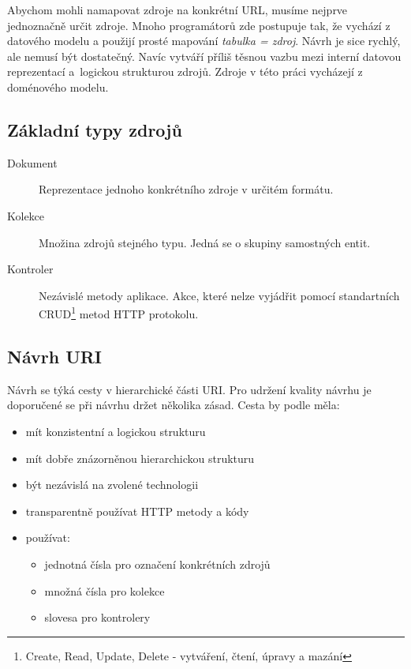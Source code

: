 Abychom mohli namapovat zdroje na konkrétní URL, musíme nejprve jednoznačně určit zdroje.
Mnoho programátorů zde postupuje tak, že vychází z datového modelu a použijí prosté mapování \textit{tabulka = zdroj}.
Návrh je sice rychlý, ale nemusí být dostatečný. Navíc vytváří příliš těsnou vazbu mezi interní datovou reprezentací
a~logickou strukturou zdrojů. Zdroje v této práci vycházejí z doménového modelu.

\subsection{Základní typy zdrojů \cite{rest_vse}}

\begin{description}
  \item[Dokument] Reprezentace jednoho konkrétního zdroje v určitém formátu.
  \item[Kolekce] Množina zdrojů stejného typu. Jedná se o skupiny samostných entit.
  \item[Kontroler] Nezávislé metody aplikace. Akce, které nelze vyjádřit pomocí standartních
  CRUD\footnote{Create, Read, Update, Delete - vytváření, čtení, úpravy a mazání} metod HTTP protokolu.
\end{description}

\subsection{Návrh URI}

Návrh se týká cesty v hierarchické části URI. Pro udržení kvality návrhu je doporučené se při návrhu  držet několika zásad. Cesta by podle \cite{rest_vse} měla:
    
\begin{itemize}
\item mít konzistentní a logickou strukturu
\item mít dobře znázorněnou hierarchickou strukturu
\item být nezávislá na zvolené technologii
\item transparentně používat HTTP metody a kódy
\item používat:
\begin{itemize}
\item jednotná čísla pro označení konkrétních zdrojů
\item množná čísla pro kolekce
\item slovesa pro kontrolery
\end{itemize}
\end{itemize}

